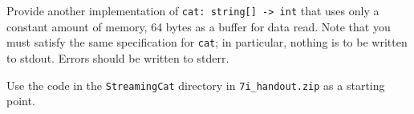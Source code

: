 Provide another implementation of \texttt{cat: string[] -> int} that uses only a constant amount of memory, 64 bytes as a buffer for data read.  Note that you must satisfy the same specification for \texttt{cat}; in particular, nothing is to be written to stdout. Errors should be written to stderr.

Use the code in the \verb!StreamingCat! directory in \verb!7i_handout.zip! as a starting point. 

